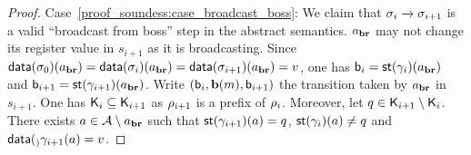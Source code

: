 \begin{proof}
Case~\ref{proof_soundess:case_broadcast_boss}:  We claim that $\sigma_i \xrightarrow{} \sigma_{i+1}$ is a valid ``broadcast from boss'' step in the abstract semantics.
$a_{\textbf{br}}$ may not change its register value in $s_{i+1}$ as it is broadcasting. Since $\mathsf{data}(\sigma_0)(a_{\textbf{br}}) = \mathsf{data}(\sigma_{i})(a_{\textbf{br}}) = \mathsf{data}(\sigma_{i+1})(a_{\textbf{br}}) = v$, 
one has $\mathsf{b}_i = \mathsf{st}(\gamma_i)(a_{\textbf{br}})$ and $\mathsf{b}_{i+1} =  \mathsf{st}(\gamma_{i+1})(a_{\textbf{br}})$. Write $(\mathsf{b}_i, \textbf{b}(m), \mathsf{b}_{i+1})$ the transition taken by $a_{\textbf{br}}$ in $s_{i+1}$. 
One has $\mathsf{K}_i \subseteq \mathsf{K}_{i+1}$ as $\rho_{i+1}$ is a prefix of $\rho_i$. Moreover, let $q \in \mathsf{K}_{i+1} \setminus \mathsf{K}_i$. 
There exists $a \in \mathcal{A} \setminus a_{\textbf{br}}$ such that $\mathsf{st}(\gamma_{i+1})(a) = q$, $\mathsf{st}(\gamma_{i})(a) \ne q$ and $\mathsf{data}(_){\gamma_{i+1}}(a) = v$. 
\end{proof}